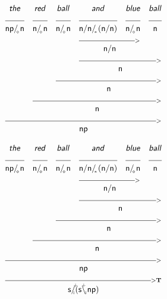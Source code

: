 \documentclass{article}
\newcommand{\deriv}[2]
{  \renewcommand{\arraystretch}{.5}
$\begin{array}[t]{*{#1}{c}}
     #2
   \end{array}$ }
\newcommand{\gf}[1]{\textsf{\textsl{#1}}}
\newcommand{\cf}[1]{\mbox{\ensuremath{\cfont{#1}}}}
\newcommand{\uline}[1]
{\mc{#1}{\hrulefill} }
\newcommand{\mc}[2]
  {\multicolumn{#1}{c}{#2}}
\newcommand{\cfont}{\mathsf}
\newcommand{\bs}{\backslash}
\newcommand{\subsa}[1]{\hspace{-0.75mm}_{_{#1}}}
\newcommand{\subsb}[1]{\hspace{-0.10mm}_{_{#1}}}
\newcommand{\supsa}[1]{\hspace{-1.75mm}^{^{#1}} }
\newcommand{\supsb}[1]{\hspace{-0.80mm}^{^{#1}}  }
\begin{document}
\deriv{6}{
\gf{the} & \gf{red} & \gf{ball} & \gf{and} & \gf{blue} & \gf{ball} \\
\uline{1} & \uline{1} & \uline{1} & \uline{1} & \uline{1} & \uline{1} \\
\cf{np/ \subsa{\diamond} n} & \cf{n/ \subsa{\diamond} n} & \cf{n/ \subsa{\diamond} n} & \cf{n/ n/ \subsa{*} (n/ n)} & \cf{n/ \subsa{\diamond} n} & \cf{n} \\
&&& \mc{2} {\hrulefill_{>}} \\
&&& \mc{2}{\cf{n/ n}} \\
&&& \mc{3} {\hrulefill_{>}} \\
&&& \mc{3}{\cf{n}} \\
&& \mc{4} {\hrulefill_{>}} \\
&& \mc{4}{\cf{n}} \\
& \mc{5} {\hrulefill_{>}} \\
& \mc{5}{\cf{n}} \\
 \mc{6} {\hrulefill_{>}} \\
 \mc{6}{\cf{np}} \\
}

\vspace{5mm}

\deriv{6}{
\gf{the} & \gf{red} & \gf{ball} & \gf{and} & \gf{blue} & \gf{ball} \\
\uline{1} & \uline{1} & \uline{1} & \uline{1} & \uline{1} & \uline{1} \\
\cf{np/ \subsa{\diamond} n} & \cf{n/ \subsa{\diamond} n} & \cf{n/ \subsa{\diamond} n} & \cf{n/ n/ \subsa{*} (n/ n)} & \cf{n/ \subsa{\diamond} n} & \cf{n} \\
&&& \mc{2} {\hrulefill_{>}} \\
&&& \mc{2}{\cf{n/ n}} \\
&&& \mc{3} {\hrulefill_{>}} \\
&&& \mc{3}{\cf{n}} \\
&& \mc{4} {\hrulefill_{>}} \\
&& \mc{4}{\cf{n}} \\
& \mc{5} {\hrulefill_{>}} \\
& \mc{5}{\cf{n}} \\
 \mc{6} {\hrulefill_{>}} \\
 \mc{6}{\cf{np}} \\
 \mc{6} {\hrulefill_{>\mathbf{T}}}\\
 \mc{6}{\cf{s/ \supsb{+} \hspace{-1.45mm} \subsa{i} (s\bs \supsa{+} \hspace{-0.50mm} \subsb{i} np)}} \\
}
\end{document}
